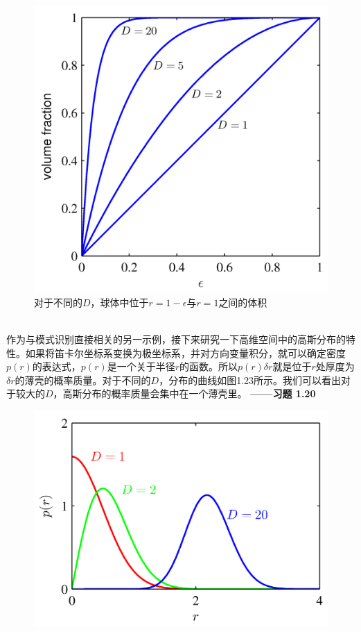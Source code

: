 \documentclass[b5paper]{book}
\numberwithin{equation}{chapter}
\begin{document}
{\begin{figure}[ht]
		\includegraphics[scale=0.8]{Images/1-22.png}
		\caption{对于不同的$D$，球体中位于$r=1-\epsilon$与$r=1$之间的体积}
		\label{fig:1-22}
	\end{figure}
	\\
	\indent 作为与模式识别直接相关的另一示例，接下来研究一下高维空间中的高斯分布的特性。如果将笛卡尔坐标系变换为极坐标系，并对方向变量积分，就可以确定密度$p(r)$的表达式，$p(r)$是一个关于半径$r$的函数。所以$p(r)\delta r$就是位于$r$处厚度为$\delta r$的薄壳的概率质量。对于不同的$D$，分布的曲线如图1.23所示。我们可以看出对于较大的$D$，高斯分布的概率质量会集中在一个薄壳里。\color{red} \textbf{——习题 1.20}　\color{black}
	\begin{figure}[ht]
		\centering
		\includegraphics[scale=0.8]{Images/1-23.png}

\end{figure}}
\end{document}
